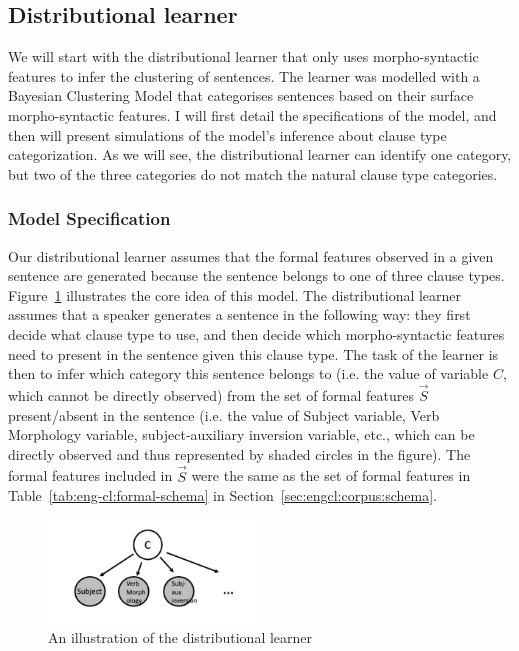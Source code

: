 \subsection{Distributional learner}
\label{sec:engcl:model:baseline}

We will start with the distributional learner that only uses morpho-syntactic features to infer the clustering of sentences. The learner was modelled with a Bayesian Clustering Model that categorises sentences based on their surface morpho-syntactic features. I will first detail the specifications of the model, and then will present simulations of the model's inference about clause type categorization. As we will see, the distributional learner can identify one category, but two of the three categories do not match the natural clause type categories.  %


\subsubsection{Model Specification}
\label{sec:engcl:model:baseline:spec}


Our distributional learner assumes that the formal features observed in a given sentence are generated because the sentence belongs to one of three clause types. Figure~\ref{fig:baseline-unplate} illustrates the core idea of this model. The distributional learner assumes that a speaker generates a sentence in the following way: they first decide what clause type to use, and then decide which morpho-syntactic features need to present in the sentence given this clause type. The task of the learner is then to infer which category this sentence belongs to (i.e. the value of variable $C$, which cannot be directly observed) from the set of formal features $\vec{S}$ present/absent in the sentence (i.e. the value of Subject variable, Verb Morphology variable, subject-auxiliary inversion variable, etc., which can be directly observed and thus represented by shaded circles in the figure). The formal features included in $\vec{S}$ were the same as the set of formal features in Table~\ref{tab:eng-cl:formal-schema} in Section~\ref{sec:engcl:corpus:schema}.

\begin{figure}[H]
    \centering
    \includegraphics[width=0.5\textwidth]{figures/baseline-update.jpg}
    \caption{An illustration of the distributional learner}
    \label{fig:baseline-unplate}
\end{figure}

